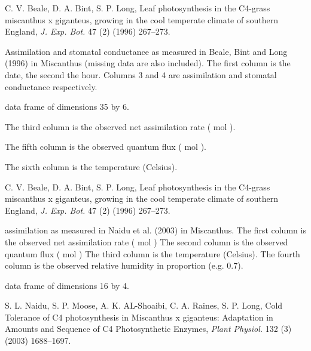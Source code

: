 \documentclass[letterpaper]{book}
\begin{document}
%
\begin{Source}\relax
C. V. Beale, D. A. Bint, S. P. Long, Leaf photosynthesis in
the C4-grass miscanthus x giganteus, growing in the cool
temperate climate of southern England, \emph{J. Exp. Bot.}
47 (2) (1996) 267--273.
\end{Source}
%
\begin{Description}\relax
Assimilation and stomatal conductance as measured in Beale,
Bint and Long (1996) in Miscanthus (missing data are also
included).  The first column is the date, the second the
hour. Columns 3 and 4 are assimilation and stomatal
conductance respectively.
\end{Description}
%
\begin{Format}
data frame of dimensions 35 by 6.
\end{Format}
%
\begin{Details}\relax
The third column is the observed net assimilation rate
(\eqn{\mu}{} mol  ).

The fifth column is the observed quantum flux (\eqn{\mu}{}
mol  ).

The sixth column is the temperature (Celsius).
\end{Details}
%
\begin{Source}\relax
C. V. Beale, D. A. Bint, S. P. Long, Leaf photosynthesis in
the C4-grass miscanthus x giganteus, growing in the cool
temperate climate of southern England, \emph{J. Exp. Bot.}
47 (2) (1996) 267--273.
\end{Source}
%
\begin{Description}\relax
assimilation as measured in Naidu et al. (2003) in
Miscanthus. The first column is the observed net
assimilation rate (\eqn{\mu}{} mol  )
The second column is the observed quantum flux (\eqn{\mu}{}
mol  ) The third column is the
temperature (Celsius). The fourth column is the observed
relative humidity in proportion (e.g. 0.7).
\end{Description}
%
\begin{Format}
data frame of dimensions 16 by 4.
\end{Format}
%
\begin{Source}\relax
S. L. Naidu, S. P. Moose, A. K. AL-Shoaibi, C. A. Raines,
S. P. Long, Cold Tolerance of C4 photosynthesis in
Miscanthus x giganteus: Adaptation in Amounts and Sequence
of C4 Photosynthetic Enzymes, \emph{Plant Physiol.} 132 (3)
(2003) 1688--1697.
\end{Source}
\end{document}
